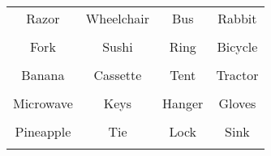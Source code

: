 \documentclass[12pt,a4paper]{article}
\begin{document}
\thispagestyle{empty}
\begin{table}[]
\centering
\Huge
\begin{tabular}{cccc}
 Razor& Wheelchair& Bus& Rabbit\\  & & & \\
 Fork& Sushi& Ring& Bicycle\\  & & & \\
 Banana& Cassette& Tent& Tractor\\  & & & \\
 Microwave& Keys& Hanger& Gloves\\  & & & \\
 Pineapple& Tie& Lock& Sink\\  & & & \\
\end{tabular}
\end{table}
\end{document}

